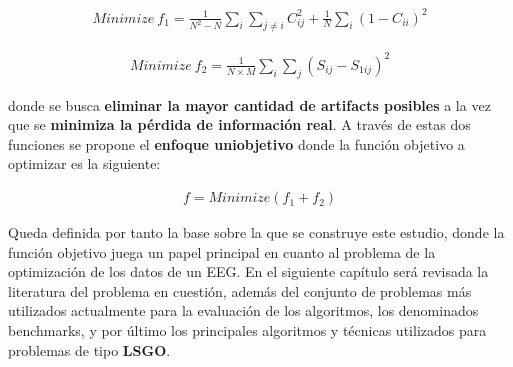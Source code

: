   \begin{equation} \label{eq:function1}
	 \begin{gathered}
	 	Minimize \ f_1 = \frac{1}{N^2 -N} \sum_{i}^{} \sum_{j \neq i}^{} C_{ij}^2 + \frac{1}{N} \sum_{i}^{} (1-C_{ii})^2
	 \end{gathered}
 \end{equation}
 
  \begin{equation} \label{eq:function2}
	 \begin{gathered}
	 	Minimize \ f_2 = \frac{1}{N \times M} \sum_{i}^{} \sum_{j}^{} (S_{ij} - S_{1ij})^2
	 \end{gathered}
 \end{equation}
 
 donde se busca \textbf{eliminar la mayor cantidad de artifacts posibles} a la vez que se \textbf{minimiza la pérdida de información real}. A través de estas dos funciones se propone el  \textbf{enfoque uniobjetivo} donde la función objetivo a optimizar es la siguiente:
 
 \begin{equation} \label{eq:FObj}
	 \begin{gathered}
	 	f = Minimize(f_1 + f_2)
	 \end{gathered}
 \end{equation}
 
 Queda definida por tanto la base sobre la que se construye este estudio, donde la función objetivo juega un papel principal en cuanto al problema de la optimización de los datos de un EEG. En el siguiente capítulo será revisada la literatura del problema en cuestión, además del conjunto de problemas más utilizados actualmente para la evaluación de los algoritmos, los denominados benchmarks, y por último los principales algoritmos y técnicas utilizados para problemas de tipo \textbf{LSGO}.